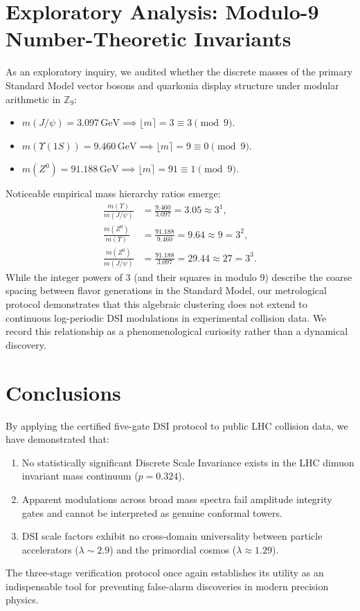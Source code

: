 \documentclass[11pt,a4paper]{article}
\begin{document}
\section{Exploratory Analysis: Modulo-9 Number-Theoretic Invariants}
As an exploratory inquiry, we audited whether the discrete masses of the primary Standard Model vector bosons and quarkonia display structure under modular arithmetic in $\mathbb{Z}_9$:
\begin{itemize}
    \item $m(J/\psi) = 3.097\,\text{GeV} \implies \lfloor m \rceil = 3 \equiv 3 \pmod 9$.
    \item $m(\Upsilon(1S)) = 9.460\,\text{GeV} \implies \lfloor m \rceil = 9 \equiv 0 \pmod 9$.
    \item $m(Z^0) = 91.188\,\text{GeV} \implies \lfloor m \rceil = 91 \equiv 1 \pmod 9$.
\end{itemize}
Noticeable empirical mass hierarchy ratios emerge:
\begin{align}
\frac{m(\Upsilon)}{m(J/\psi)} &= \frac{9.460}{3.097} = 3.05 \approx 3^1, \\
\frac{m(Z^0)}{m(\Upsilon)} &= \frac{91.188}{9.460} = 9.64 \approx 9 = 3^2, \\
\frac{m(Z^0)}{m(J/\psi)} &= \frac{91.188}{3.097} = 29.44 \approx 27 = 3^3.
\end{align}
While the integer powers of $3$ (and their squares in modulo 9) describe the coarse spacing between flavor generations in the Standard Model, our metrological protocol demonstrates that this algebraic clustering does not extend to continuous log-periodic DSI modulations in experimental collision data. We record this relationship as a phenomenological curiosity rather than a dynamical discovery.

\section{Conclusions}
By applying the certified five-gate DSI protocol to public LHC collision data, we have demonstrated that:
\begin{enumerate}
    \item No statistically significant Discrete Scale Invariance exists in the LHC dimuon invariant mass continuum ($p = 0.324$).
    \item Apparent modulations across broad mass spectra fail amplitude integrity gates and cannot be interpreted as genuine conformal towers.
    \item DSI scale factors exhibit no cross-domain universality between particle accelerators ($\lambda \sim 2.9$) and the primordial cosmos ($\lambda \approx 1.29$).
\end{enumerate}
The three-stage verification protocol once again establishes its utility as an indispensable tool for preventing false-alarm discoveries in modern precision physics.
\end{document}
